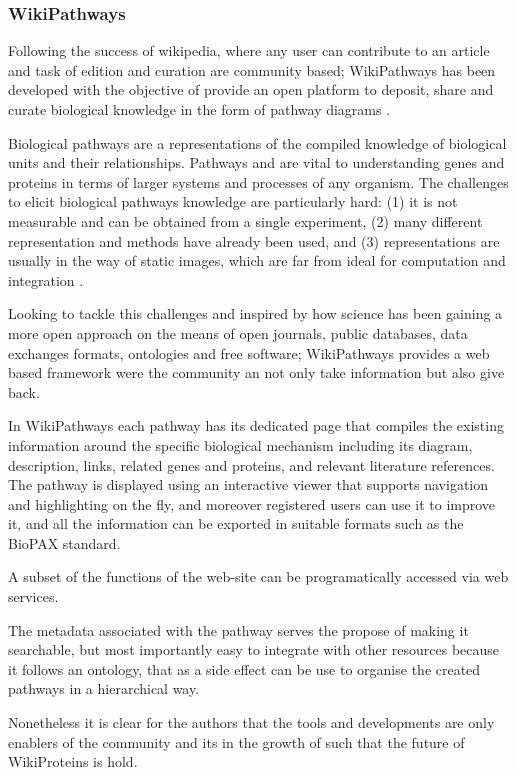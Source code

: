 \subsubsection{WikiPathways}
Following the success of wikipedia, where any user can contribute to an article and task of edition and curation are community based; WikiPathways has been developed with the objective of provide an open platform to deposit, share and curate biological knowledge in the form of pathway diagrams \cite{KEL2012}.

Biological pathways are a representations of the compiled knowledge of biological units and their relationships. Pathways and are vital to understanding genes and proteins in terms of larger systems and processes of any organism. The challenges to elicit biological pathways knowledge are particularly hard: (1) it is not measurable and can be obtained from a single experiment, (2) many different representation and methods have already been used, and (3)  representations are usually in the way of static images, which are far from ideal for computation and integration \cite{PIC2008}.

Looking to tackle this challenges and inspired by how science has been gaining a more open approach on the means of open journals, public databases, data exchanges formats, ontologies and free software; WikiPathways provides a web based framework were the community an not only take information but also give back.

In WikiPathways each pathway has its dedicated page that compiles the existing information around the specific biological mechanism including its diagram, description, links, related genes and proteins, and relevant literature references. The pathway is displayed using an interactive viewer that supports navigation and highlighting on the fly, and moreover registered users can use it to improve it, and all the information can be exported in suitable formats such as the BioPAX standard.

A subset of the functions of the web-site can be programatically accessed via web services.

The metadata associated with the pathway serves the propose of making it searchable, but most importantly easy to integrate with other resources because it follows an ontology, that as a side effect can be use to organise the created pathways in a hierarchical way.

Nonetheless it is clear for the authors that the tools and developments are only enablers of the community and its in the growth of such that the future of WikiProteins is hold.

